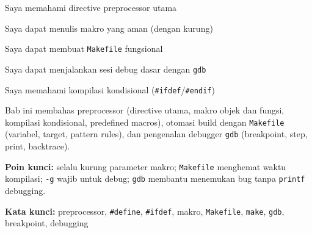 \documentclass[../main.tex]{subfiles}
\begin{document}
\begin{checklist}
  \item Saya memahami directive preprocessor utama
  \item Saya dapat menulis makro yang aman (dengan kurung)
  \item Saya dapat membuat \texttt{Makefile} fungsional
  \item Saya dapat menjalankan sesi debug dasar dengan \texttt{gdb}
  \item Saya memahami kompilasi kondisional (\texttt{\#ifdef}/\texttt{\#endif})
\end{checklist}

\begin{rangkuman}
Bab ini membahas preprocessor (directive utama, makro objek dan fungsi, kompilasi kondisional, predefined macros), otomasi build dengan \texttt{Makefile} (variabel, target, pattern rules), dan pengenalan debugger \texttt{gdb} (breakpoint, step, print, backtrace).

\textbf{Poin kunci:} selalu kurung parameter makro; \texttt{Makefile} menghemat waktu kompilasi; \texttt{-g} wajib untuk debug; \texttt{gdb} membantu menemukan bug tanpa \texttt{printf} debugging.

\textbf{Kata kunci:} preprocessor, \texttt{\#define}, \texttt{\#ifdef}, makro, \texttt{Makefile}, \texttt{make}, \texttt{gdb}, breakpoint, debugging
\end{rangkuman}
\end{document}
